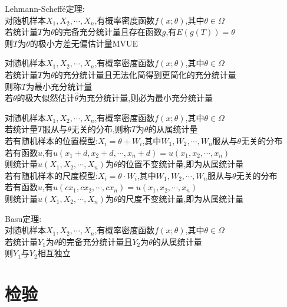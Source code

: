 \begin{dingli}
Lehmann-Scheffé定理:\\
对随机样本$X_1,X_2,\cdots,X_n$,有概率密度函数$f(x;\theta)$,其中$\theta\in\Omega$\\
若统计量$T$为$\theta$的完备充分统计量且存在函数$g$,有$E(g(T))=\theta$\\
则$T$为$\theta$的极小方差无偏估计量MVUE
\end{dingli}

\begin{dingyi}
对随机样本$X_1,X_2,\cdots,X_n$,有概率密度函数$f(x;\theta)$,其中$\theta\in\Omega$\\
若统计量$T$为$\theta$的充分统计量且无法化简得到更简化的充分统计量\\
则称$T$为最小充分统计量\\
若$\theta$的极大似然估计$\hat{\theta}$为充分统计量,则必为最小充分统计量
\end{dingyi}

\begin{dingyi}
对随机样本$X_1,X_2,\cdots,X_n$,有概率密度函数$f(x;\theta)$,其中$\theta\in\Omega$\\
若统计量$T$服从与$\theta$无关的分布,则称$T$为$\theta$的从属统计量\\
若有随机样本的位置模型:$X_i=\theta+W_i$,其中$W_1,W_2,\cdots,W_n$服从与$\theta$无关的分布\\
若有函数$u$,有$u(x_1+d,x_2+d,\cdots,x_n+d)=u(x_1,x_2,\cdots,x_n)$\\
则统计量$u(X_1,X_2,\cdots,X_n)$为$\theta$的位置不变统计量,即为从属统计量\\
若有随机样本的尺度模型:$X_i=\theta\cdot W_i$,其中$W_1,W_2,\cdots,W_n$服从与$\theta$无关的分布\\
若有函数$u$,有$u(cx_1,cx_2,\cdots,cx_n)=u(x_1,x_2,\cdots,x_n)$\\
则统计量$u(X_1,X_2,\cdots,X_n)$为$\theta$的尺度不变统计量,即为从属统计量
\end{dingyi}

\begin{dingli}
Basu定理:\\
对随机样本$X_1,X_2,\cdots,X_n$,有概率密度函数$f(x;\theta)$,其中$\theta\in\Omega$\\
若统计量$Y_1$为$\theta$的完备充分统计量且$Y_2$为$\theta$的从属统计量\\
则$Y_1$与$Y_2$相互独立
\end{dingli}

\chapter{检验}

